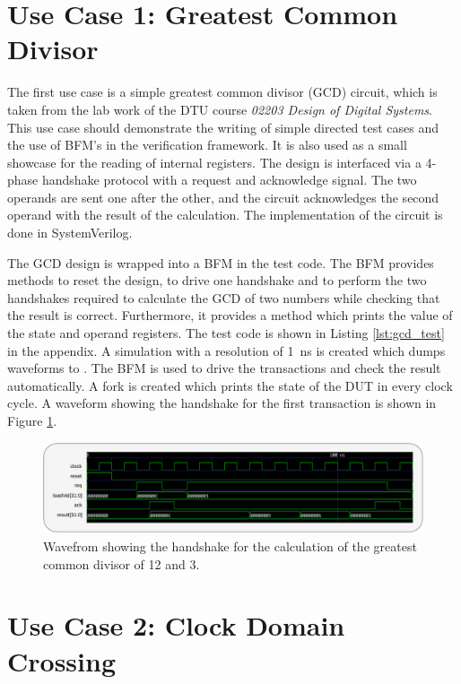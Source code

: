 \section{Use Case 1: Greatest Common Divisor} %

The first use case is a simple greatest common divisor (GCD) circuit, which is taken from the lab work of the DTU course \textit{02203 Design of Digital Systems}. This use case should demonstrate the writing of simple directed test cases and the use of BFM's in the verification framework. It is also used as a small showcase for the reading of internal registers. The design is interfaced via a 4-phase handshake protocol with a request and acknowledge signal. The two operands are sent one after the other, and the circuit acknowledges the second operand with the result of the calculation. The implementation of the circuit is done in SystemVerilog.

The GCD design is wrapped into a BFM in the test code. The BFM provides methods to reset the design, to drive one handshake and to perform the two handshakes required to calculate the GCD of two numbers while checking that the result is correct. Furthermore, it provides a method which prints the value of the state and operand registers. The test code is shown in Listing \ref{lst:gcd_test} in the appendix. A simulation with a resolution of \SI{1}{ns} is created which dumps waveforms to . The BFM is used to drive the transactions and check the result automatically. A fork is created which prints the state of the DUT in every clock cycle. A waveform showing the handshake for the first transaction is shown in Figure \ref{fig:gcd_timing}.

\begin{figure}[t]
\centering
\includegraphics[width=\textwidth]{diagrams/gcd_timing.pdf}
\caption{Wavefrom showing the handshake for the calculation of the greatest common divisor of 12 and 3.}
\label{fig:gcd_timing}
\end{figure}

\section{Use Case 2: Clock Domain Crossing} %

